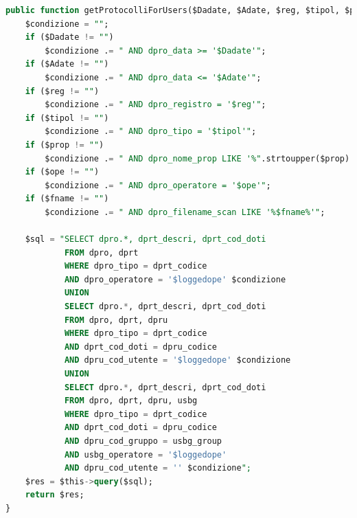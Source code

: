         \begin{lstlisting}[language=SQL, caption=Query per Dashboard]
public function getProtocolliForUsers($Dadate, $Adate, $reg, $tipol, $prop, $ope, $fname, $loggedope) {
    $condizione = "";
    if ($Dadate != "")
        $condizione .= " AND dpro_data >= '$Dadate'";
    if ($Adate != "")
        $condizione .= " AND dpro_data <= '$Adate'";
    if ($reg != "")
        $condizione .= " AND dpro_registro = '$reg'";
    if ($tipol != "")
        $condizione .= " AND dpro_tipo = '$tipol'";
    if ($prop != "")
        $condizione .= " AND dpro_nome_prop LIKE '%".strtoupper($prop)."%'";
    if ($ope != "")
        $condizione .= " AND dpro_operatore = '$ope'";
    if ($fname != "")
        $condizione .= " AND dpro_filename_scan LIKE '%$fname%'";

    $sql = "SELECT dpro.*, dprt_descri, dprt_cod_doti  
            FROM dpro, dprt
            WHERE dpro_tipo = dprt_codice
            AND dpro_operatore = '$loggedope' $condizione
            UNION
            SELECT dpro.*, dprt_descri, dprt_cod_doti  
            FROM dpro, dprt, dpru
            WHERE dpro_tipo = dprt_codice
            AND dprt_cod_doti = dpru_codice
            AND dpru_cod_utente = '$loggedope' $condizione
            UNION
            SELECT dpro.*, dprt_descri, dprt_cod_doti  
            FROM dpro, dprt, dpru, usbg
            WHERE dpro_tipo = dprt_codice
            AND dprt_cod_doti = dpru_codice
            AND dpru_cod_gruppo = usbg_group
            AND usbg_operatore = '$loggedope' 
            AND dpru_cod_utente = '' $condizione";
    $res = $this->query($sql);
    return $res;
}
        \end{lstlisting}
        
